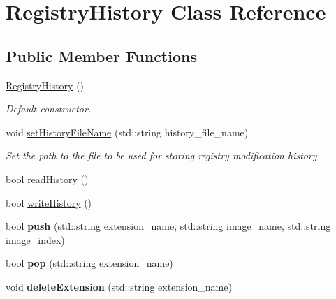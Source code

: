 \hypertarget{class_registry_history}{}\section{Registry\+History Class Reference}
\label{class_registry_history}
\subsection*{Public Member Functions}
\begin{DoxyCompactItemize}
\item 
\hypertarget{class_registry_history_ab8ca406519bf9c2383af62b655e091ec}{}\hyperlink{class_registry_history_ab8ca406519bf9c2383af62b655e091ec}{Registry\+History} ()\label{class_registry_history_ab8ca406519bf9c2383af62b655e091ec}

\begin{DoxyCompactList}\small\item\em Default constructor. \end{DoxyCompactList}\item 
void \hyperlink{class_registry_history_afb10619d4c6e5b1eef4f27b11aa71ec8}{set\+History\+File\+Name} (std\+::string history\+\_\+file\+\_\+name)
\begin{DoxyCompactList}\small\item\em Set the path to the file to be used for storing registry modification history. \end{DoxyCompactList}\item 
bool \hyperlink{class_registry_history_a2a81ef9ef2d13fba16c4596a5e24409b}{read\+History} ()
\item 
bool \hyperlink{class_registry_history_ad05f552791c50a88291483544f9ffb80}{write\+History} ()
\item 
\hypertarget{class_registry_history_a3cad08c57fa9b967a9d7d2b1e7a672d1}{}bool {\bfseries push} (std\+::string extension\+\_\+name, std\+::string image\+\_\+name, std\+::string image\+\_\+index)\label{class_registry_history_a3cad08c57fa9b967a9d7d2b1e7a672d1}

\item 
\hypertarget{class_registry_history_a7dbf9ed9286304148a1e185d9642a994}{}bool {\bfseries pop} (std\+::string extension\+\_\+name)\label{class_registry_history_a7dbf9ed9286304148a1e185d9642a994}

\item 
\hypertarget{class_registry_history_a949045dc581267a6565c6f801ea2ddc2}{}void {\bfseries delete\+Extension} (std\+::string extension\+\_\+name)\label{class_registry_history_a949045dc581267a6565c6f801ea2ddc2}


\end{DoxyCompactItemize}
